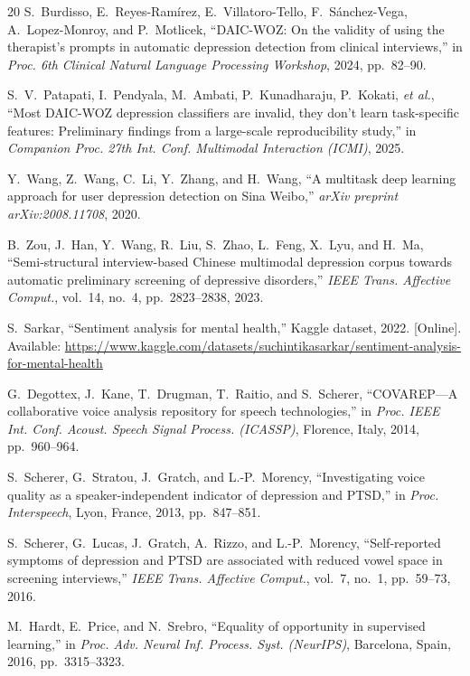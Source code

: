 \documentclass[journal]{IEEEtran}
\begin{document}
\begin{thebibliography}{20}
S.~Burdisso, E.~Reyes-Ram\'irez, E.~Villatoro-Tello,
F.~S\'anchez-Vega, A.~Lopez-Monroy, and P.~Motlicek,
``DAIC-WOZ: On the validity of using the therapist's prompts
in automatic depression detection from clinical interviews,''
in \textit{Proc. 6th Clinical Natural Language Processing
Workshop}, 2024, pp.~82--90.

S.~V.~Patapati, I.~Pendyala, M.~Ambati, P.~Kunadharaju,
P.~Kokati, \emph{et al.},
``Most DAIC-WOZ depression classifiers are invalid, they don't
learn task-specific features: Preliminary findings from a
large-scale reproducibility study,'' in \textit{Companion Proc.
27th Int. Conf. Multimodal Interaction (ICMI)}, 2025.

Y.~Wang, Z.~Wang, C.~Li, Y.~Zhang, and H.~Wang,
``A multitask deep learning approach for user depression
detection on Sina Weibo,''
\textit{arXiv preprint arXiv:2008.11708}, 2020.

B.~Zou, J.~Han, Y.~Wang, R.~Liu, S.~Zhao, L.~Feng, X.~Lyu, and H.~Ma,
``Semi-structural interview-based Chinese multimodal depression
corpus towards automatic preliminary screening of depressive
disorders,''
\textit{IEEE Trans. Affective Comput.}, vol.~14, no.~4,
pp.~2823--2838, 2023.

S.~Sarkar,
``Sentiment analysis for mental health,''
Kaggle dataset, 2022. [Online]. Available:
\url{https://www.kaggle.com/datasets/suchintikasarkar/sentiment-analysis-for-mental-health}

G.~Degottex, J.~Kane, T.~Drugman, T.~Raitio, and S.~Scherer,
``COVAREP---A collaborative voice analysis repository for speech
technologies,'' in \textit{Proc. IEEE Int. Conf. Acoust. Speech
Signal Process. (ICASSP)}, Florence, Italy, 2014, pp.~960--964.

S.~Scherer, G.~Stratou, J.~Gratch, and L.-P.~Morency,
``Investigating voice quality as a speaker-independent indicator
of depression and PTSD,'' in \textit{Proc. Interspeech},
Lyon, France, 2013, pp.~847--851.

S.~Scherer, G.~Lucas, J.~Gratch, A.~Rizzo, and L.-P.~Morency,
``Self-reported symptoms of depression and PTSD are associated with
reduced vowel space in screening interviews,''
\textit{IEEE Trans. Affective Comput.}, vol.~7, no.~1,
pp.~59--73, 2016.

M.~Hardt, E.~Price, and N.~Srebro,
``Equality of opportunity in supervised learning,'' in
\textit{Proc. Adv. Neural Inf. Process. Syst. (NeurIPS)},
Barcelona, Spain, 2016, pp.~3315--3323.


\end{thebibliography}
\end{document}
